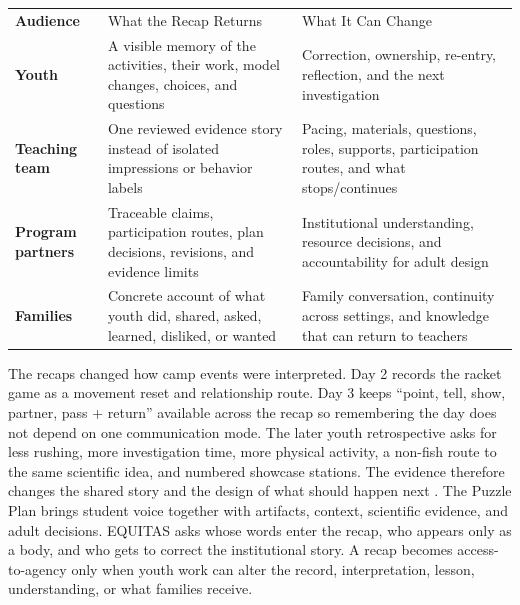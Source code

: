 \begin{tabularx}{\textwidth}{
>{\bfseries\RaggedRight\arraybackslash}p{0.70in}
>{\RaggedRight\arraybackslash}p{2.98in}
>{\RaggedRight\arraybackslash}X}

\rowcolor{MidTeal}
\color{white}Audience &
\color{white}What the Recap Returns &
\color{white}What It Can Change \\

Youth &
A visible memory of the activities, their work, model changes, choices, and questions &
Correction, ownership, re-entry, reflection, and the next investigation \\

\rowcolor{SoftGray}
Teaching team &
One reviewed evidence story instead of isolated impressions or behavior labels &
Pacing, materials, questions, roles, supports, participation routes, and what stops/continues \\

Program partners &
Traceable claims, participation routes, plan decisions, revisions, and evidence limits &
Institutional understanding, resource decisions, and accountability for adult design \\

\rowcolor{SoftGray}
Families &
Concrete account of what youth did, shared, asked, learned, disliked, or wanted &
Family conversation, continuity across settings, and knowledge that can return to teachers\\

\end{tabularx}


The recaps changed how camp events were interpreted. Day 2 records the racket game as a movement reset and relationship route. Day 3 keeps ``point, tell, show, partner, pass + return'' available across the recap so remembering the day does not depend on one communication mode. The later youth retrospective asks for less rushing, more investigation time, more physical activity, a non-fish route to the same scientific idea, and numbered showcase stations. The evidence therefore changes the shared story and the design of what should happen next \citep{campEvidence2026}. The Puzzle Plan brings student voice together with artifacts, context, scientific evidence, and adult decisions. EQUITAS asks whose words enter the recap, who appears only as a body, and who gets to correct the institutional story. A recap becomes access-to-agency only when youth work can alter the record, interpretation, lesson, understanding, or what families receive.

